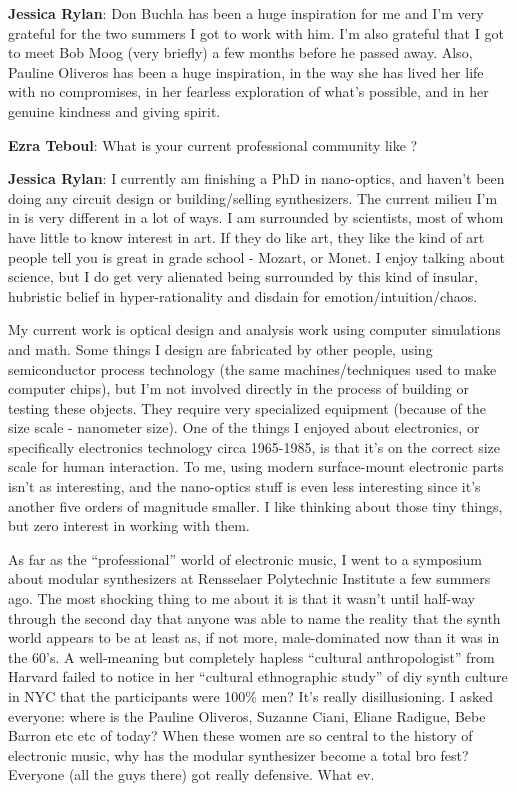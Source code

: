 \textbf{Jessica Rylan}: Don Buchla has been a huge inspiration for me and I'm very grateful for the two summers I got to work with him. I'm also grateful that I got to meet Bob Moog (very briefly) a few months before he passed away. Also, Pauline Oliveros has been a huge inspiration, in the way she has lived her life with no compromises, in her fearless exploration of what's possible, and in her genuine kindness and giving spirit.

\textbf{Ezra Teboul}: What is your current professional community like ? 

                  
\textbf{Jessica Rylan}: I currently am finishing a PhD in nano-optics, and haven't been doing any circuit design or building/selling synthesizers. The current milieu I'm in is very different in a lot of ways. I am surrounded by scientists, most of whom have little to know interest in art. If they do like art, they like the kind of art people tell you is great in grade school - Mozart, or Monet. I enjoy talking about science, but I do get very alienated being surrounded by this kind of insular, hubristic belief in hyper-rationality and disdain for emotion/intuition/chaos. 

My current work is optical design and analysis work using computer simulations and math. Some things I design are fabricated by other people, using semiconductor process technology (the same machines/techniques used to make computer chips), but I'm not involved directly in the process of building or testing these objects. They require very specialized equipment (because of the size scale - nanometer size). One of the things I enjoyed about electronics, or specifically electronics technology circa 1965-1985, is that it's on the correct size scale for human interaction. To me, using modern surface-mount electronic parts isn't as interesting, and the nano-optics stuff is even less interesting since it's another five orders of magnitude smaller. I like thinking about those tiny things, but zero interest in working with them.

As far as the ``professional'' world of electronic music, I went to a symposium about modular synthesizers at Rensselaer Polytechnic Institute a few summers ago. The most shocking thing to me about it is that it wasn't until half-way through the second day that anyone was able to name the reality that the synth world appears to be at least as, if not more, male-dominated now than it was in the 60's. A well-meaning but completely hapless ``cultural anthropologist'' from Harvard failed to notice in her ``cultural ethnographic study'' of diy synth culture in NYC that the participants were 100\% men? It's really disillusioning. I asked everyone: where is the Pauline Oliveros, Suzanne Ciani, Eliane Radigue, Bebe Barron etc etc of today? When these women are so central to the history of electronic music, why has the modular synthesizer become a total bro fest? Everyone (all the guys there) got really defensive. What ev.

